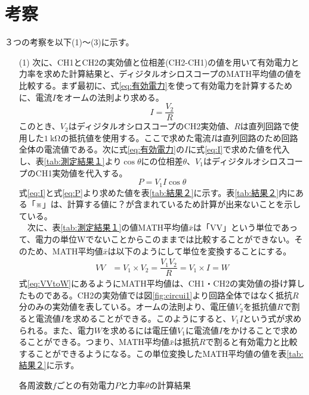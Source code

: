 \documentclass[10pt,a4paper]{jsarticle}
\numberwithin{equation}{section}
\numberwithin{figure}{section}
\numberwithin{table}{section}
\begin{document}
\section{考察}
３つの考察を以下(1)～(3)に示す。
\begin{itemize}
  \item [(1)]
  次に、CH1とCH2の実効値と位相差(CH2-CH1)の値を用いて有効電力と力率を求めた計算結果と、ディジタルオシロスコープのMATH平均値の値を比較する。まず最初に、式\ref{eq:有効電力}を使って有効電力を計算するために、電流$I$をオームの法則より求める。
  \begin{equation}
    I = \dfrac{V_2}{R}\label{eq:I}
  \end{equation}
  このとき、$V_2$はディジタルオシロスコープのCH2実効値、$R$は直列回路で使用した$\SI{1}{\kilo\ohm}$の抵抗値を使用する。ここで求めた電流$I$は直列回路のため回路全体の電流値である。次に式\ref{eq:有効電力}の$I$に式\ref{eq:I}で求めた値を代入し、表\ref{tab:測定結果１}より$\cos\theta$にの位相差$\theta$、$V_1$はディジタルオシロスコープのCH1実効値を代入する。
  \begin{equation}
    P = V_1I\cos\theta\label{eq:P}
  \end{equation}
  式\ref{eq:I}と式\ref{eq:P}より求めた値を表\ref{tab:結果２}に示す。表\ref{tab:結果２}内にある「※」は、計算する値に？が含まれているため計算が出来ないことを示している。\\
  　次に、表\ref{tab:測定結果１}の値MATH平均値$\bar{x}$は「VV」という単位であって、電力の単位Wでないことからこのままでは比較することができない。そのため、MATH平均値$\bar{x}$は以下のようにして単位を変換することにする。
  \begin{equation}
    \begin{split}
      VV & = V_1 \times V_2 = \dfrac{V_1V_2}{R} = V_1 \times I = W\label{eq:VVtoW}
    \end{split}
  \end{equation}
  式\ref{eq:VVtoW}にあるようにMATH平均値は、CH1・CH2の実効値の掛け算したものである。CH2の実効値では図\ref{fig:circui1}より回路全体ではなく抵抗$R$分のみの実効値を表している。オームの法則より、電圧値$V_2$を抵抗値$R$で割ると電流値$I$を求めることができる。このようにすると、$V_1 I$という式が求められる。また、電力$W$を求めるには電圧値$V_1$に電流値$I$をかけることで求めることができる。つまり、MATH平均値$\bar{x}$は抵抗$R$で割ると有効電力と比較することができるようになる。この単位変換したMATH平均値の値を表\ref{tab:結果２}に示す。\\
  \begin{table}[H]
    \caption{各周波数$f$ごとの有効電力$P$と力率$\theta$の計算結果}\label{tab:結果２}

\end{table}
\end{itemize}
\end{document}
